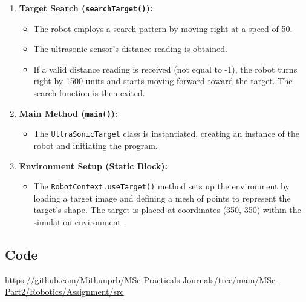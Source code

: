 \begin{enumerate}
  \item \textbf{Target Search (\texttt{searchTarget()}):}
  \begin{itemize}
    \item The robot employs a search pattern by moving right at a speed of 50.
    \item The ultrasonic sensor's distance reading is obtained.
    \item If a valid distance reading is received (not equal to -1), the robot turns right by 1500 units and starts moving forward toward the target. The search function is then exited.
  \end{itemize}
  
  \item \textbf{Main Method (\texttt{main()}):}
  \begin{itemize}
    \item The \texttt{UltraSonicTarget} class is instantiated, creating an instance of the robot and initiating the program.
  \end{itemize}
  
  \item \textbf{Environment Setup (Static Block):}
  \begin{itemize}
    \item The \texttt{RobotContext.useTarget()} method sets up the environment by loading a target image and defining a mesh of points to represent the target's shape. The target is placed at coordinates (350, 350) within the simulation environment.
  \end{itemize}
\end{enumerate}


\subsection{Code}

\label{subsec:code-first-n-follow}
\href{https://github.com/Mithunprb/MSc-Practicals-Journals/tree/main/MSc-Part2/Robotics/Assignment/src}{https://github.com/Mithunprb/MSc-Practicals-Journals/tree/main/MSc-Part2/Robotics/Assignment/src}  \\

